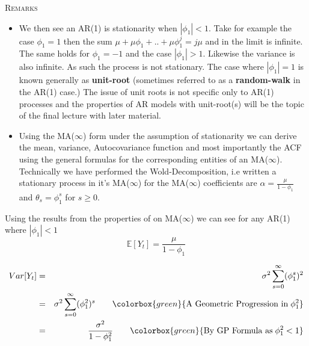 \documentclass[openany]{tufte-book} %
\newcommand{\highlight}[1]{\colorbox{green}{\ensuremath{#1}}}
\begin{document}
\vspace{10pt}
\textsc{Remarks}
\begin{itemize}
\item  We then see an AR(1) is stationarity when $|\phi_1|<1$. Take for example the case $\phi_1=1$ then the sum $\mu+\mu\phi_1+..+\mu\phi_1^j=j\mu$ and in the limit is infinite.  The same holds for $\phi_1=-1$ and the case $|\phi_1|>1$. Likewise the variance is also infinite. As such the process is not stationary.  The case where $|\phi_1|=1$ is known generally as \textbf{ unit-root }(sometimes referred to as a \textbf{random-walk} in the AR(1) case.) The issue of unit roots is not specific only to AR(1) processes and the properties of AR models with unit-root(s) will be the topic of the final lecture with later material.
    \item Using the MA($\infty$) form under the assumption of stationarity we can derive the mean, variance, Autocovariance function and most importantly the  ACF using the general formulas for the corresponding entities of an MA($\infty$). Technically we have performed the Wold-Decomposition, i.e written a stationary process in it's MA($\infty$) for the MA($\infty$) coefficients are $\alpha=\frac{\mu}{1-\phi_1}$ and $\theta_s=\phi_1^s$ for $s\geq 0$.

        \end{itemize}

        Using the results from the properties of on MA($\infty$) we can see for any AR(1) where $|\phi_1|<1$
        \begin{equation*} \mathbb{E}[Y_t]=\frac{\mu}{1-\phi_1} \end{equation*}

        \begin{eqnarray*} Var[Y_t] &=& \sigma^2 \sum_{s=0}^\infty (\phi_1^s)^2 \\
        &=& \sigma^2 \sum_{s=0}^\infty (\phi_1^{2})^s \qquad \highlight{\textrm{A Geometric Progression in} \; \phi_1^2} \\
        &=& \frac{\sigma^2}{1-\phi_1^2}  \qquad \highlight{ \textrm{By GP Formula as} \;    \phi_1^2<1} \end{eqnarray*}
\end{document}
